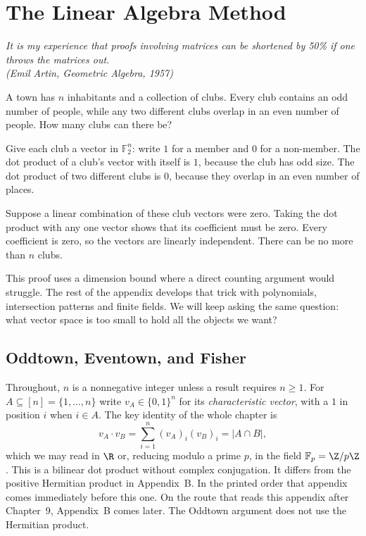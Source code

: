 \chapter{The Linear Algebra Method}

\begin{center}\itshape
It is my experience that proofs involving matrices can be shortened by 50\% if one throws the matrices out.\\
\upshape(Emil Artin, \emph{Geometric Algebra}, 1957)
\end{center}

A town has $n$ inhabitants and a collection of clubs. Every club contains an odd number of people, while any two different clubs overlap in an even number of people. How many clubs can there be?

Give each club a vector in $\mathbb F_2^n$: write $1$ for a member and $0$ for a non-member. The dot product of a club's vector with itself is $1$, because the club has odd size. The dot product of two different clubs is $0$, because they overlap in an even number of places.

Suppose a linear combination of these club vectors were zero. Taking the dot product with any one vector shows that its coefficient must be zero. Every coefficient is zero, so the vectors are linearly independent. There can be no more than $n$ clubs.

This proof uses a dimension bound where a direct counting argument would struggle. The rest of the appendix develops that trick with polynomials, intersection patterns and finite fields. We will keep asking the same question: what vector space is too small to hold all the objects we want?

\section{Oddtown, Eventown, and Fisher}

Throughout, $n$ is a nonnegative integer unless a result requires $n\ge1$.
For $A\subseteq[n]=\{1,\dots,n\}$ write $v_A\in\{0,1\}^n$ for its \emph{characteristic vector}, with a $1$ in position $i$ when $i\in A$. The key identity of the
whole chapter is
\[
v_A\cdot v_B=\sum_{i=1}^n(v_A)_i(v_B)_i=|A\cap B|,
\]
which we may read in $\R$ or, reducing modulo a prime $p$, in the field $\mathbb F_p=\Z/p\Z$.
This is a bilinear dot product without complex conjugation. It differs from
the positive Hermitian product in Appendix~B. In the printed order that appendix comes immediately before this one. On the route that reads this appendix after Chapter~9, Appendix~B comes later. The Oddtown argument does not use the Hermitian product.

